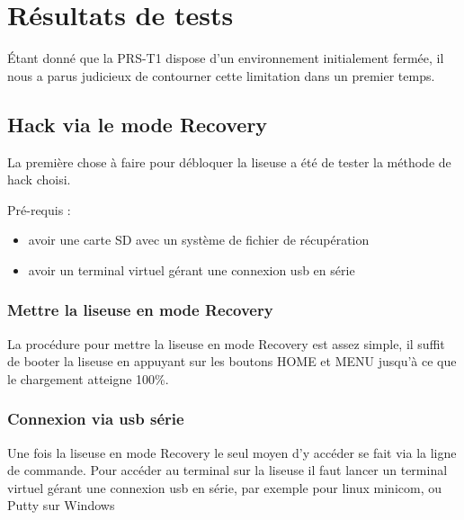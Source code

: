 \chapter{Résultats de tests}

Étant donné que la PRS-T1 dispose d'un environnement initialement fermée, il nous a parus judicieux de contourner cette limitation dans un premier temps.

\section{Hack via le mode Recovery}

La première chose à faire pour débloquer la liseuse a été de tester la méthode de hack choisi.

Pré-requis : 
\begin{itemize}
	\item avoir une carte SD avec un système de fichier de récupération 
	\item avoir un terminal virtuel gérant une connexion usb en série
\end{itemize}

\subsection{Mettre la liseuse en mode Recovery}

La procédure pour mettre la liseuse en mode Recovery est assez simple, il suffit de booter la liseuse en appuyant sur les boutons HOME et MENU jusqu’à ce que le chargement atteigne 100\%. 

\subsection{Connexion via usb série}

Une fois la liseuse en mode Recovery le seul moyen d'y accéder se fait via la ligne de commande.
Pour accéder au terminal sur la liseuse il faut lancer un terminal virtuel gérant une connexion usb en série, par exemple pour linux minicom, ou Putty sur Windows

